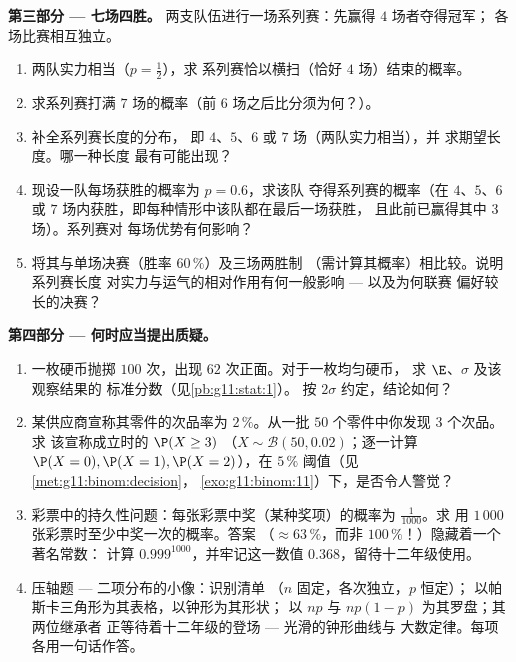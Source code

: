 \begin{problem}
\medskip
\noindent\textbf{第三部分 --- 七场四胜。}
两支队伍进行一场系列赛：先赢得 $4$ 场者夺得冠军；
各场比赛相互独立。
\begin{enumerate}[resume]
  \item 两队实力相当（$p = \frac12$），求
        系列赛恰以横扫（恰好 $4$ 场）结束的概率。
  \item 求系列赛打满
        $7$ 场的概率（前 $6$ 场之后比分须为何？）。
  \item 补全系列赛长度的分布，
        即 $4$、$5$、$6$ 或 $7$ 场（两队实力相当），并
        求期望长度。哪一种长度
        最有可能出现？
  \item 现设一队每场获胜的概率为 $p = 0.6$，求该队
        夺得系列赛的概率（在 $4$、$5$、$6$
        或 $7$ 场内获胜，即每种情形中该队都在最后一场获胜，
        且此前已赢得其中 $3$ 场）。系列赛对
        每场优势有何影响？
  \item 将其与单场决赛（胜率 $60\,\%$）及三场两胜制
        （需计算其概率）相比较。说明系列赛长度
        对实力与运气的相对作用有何一般影响 --- 以及为何联赛
        偏好较长的决赛？
\end{enumerate}

\medskip
\noindent\textbf{第四部分 --- 何时应当提出质疑。}
\begin{enumerate}[resume]
  \item 一枚硬币抛掷 $100$ 次，出现 $62$ 次正面。对于一枚均匀硬币，
        求 $\E$、$\sigma$ 及该观察结果的
        标准分数（见\cref{pb:g11:stat:1}）。
        按 $2\sigma$ 约定，结论如何？
  \item 某供应商宣称其零件的次品率为 $2\,\%$。从一批
        $50$ 个零件中你发现 $3$ 个次品。求
        该宣称成立时的 $\P(X \geq 3)$
        （$X \sim \mathcal B(50, 0.02)$；逐一计算
        $\P(X = 0), \P(X = 1), \P(X = 2)$），在
        $5\,\%$ 阈值（见\cref{met:g11:binom:decision}，
        \cref{exo:g11:binom:11}）下，是否令人警觉？
  \item 彩票中的持久性问题：每张彩票中奖（某种奖项）的概率为
        $\frac{1}{1000}$。求
        用 $1\,000$ 张彩票时至少中奖一次的概率。答案
        （$\approx 63\,\%$，而非 $100\,\%$！）隐藏着一个著名常数：
        计算 $0.999^{1000}$，并牢记这一数值
        $0.368$，留待十二年级使用。
  \item 压轴题 --- 二项分布的小像：识别清单
        （$n$ 固定，各次独立，$p$ 恒定）；
        以帕斯卡三角形为其表格，以钟形为其形状；
        以 $np$ 与 $np(1-p)$ 为其罗盘；其两位继承者
        正等待着十二年级的登场 --- 光滑的钟形曲线与
        大数定律。每项各用一句话作答。
\end{enumerate}
\end{problem}

